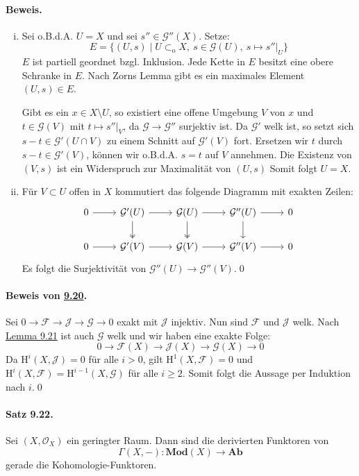 \paragraph{Beweis.}
\begin{enumerate}[(i)]
\item Sei o.B.d.A. $U=X$ und sei $s''\in\mathcal{G}''(X)$. Setze:
\[E=\{(U,s)\mid U\subset_\text{o}X,\ s\in\mathcal{G}(U),\ s\mapsto s''|_U \} \]
$E$ ist partiell geordnet bzgl. Inklusion. Jede Kette in $E$ besitzt eine obere Schranke in $E$. Nach Zorns Lemma gibt es ein maximales Element $(U,s)\in E$.

Gibt es ein $x\in X\setminus U$, so existiert eine offene Umgebung $V$ von $x$ und $t\in\mathcal{G}(V)$ mit $t\mapsto s''|_V$, da $\mathcal{G}\to\mathcal{G}''$ surjektiv ist. Da $\mathcal{G}'$ welk ist, so setzt sich $s-t\in\mathcal{G}'(U\cap V)$ zu einem Schnitt auf $\mathcal{G}'(V)$ fort. Ersetzen wir $t$ durch $s-t\in\mathcal{G}'(V)$, können wir o.B.d.A. $s=t$ auf $V$ annehmen. Die Existenz von $(V,s)$ ist ein Widerspruch zur Maximalität von $(U,s)$ Somit folgt $U=X$.
\item Für $V\subset U$ offen in $X$ kommutiert das folgende Diagramm mit exakten Zeilen:
\[\begin{tikzcd}
0 \rar & \mathcal{G}'(U)\rar\dar[two heads] & \mathcal{G}(U)\rar\dar[two heads] & \mathcal{G}''(U)\rar\dar & 0\\
0 \rar & \mathcal{G}'(V)\rar & \mathcal{G}(V)\rar & \mathcal{G}''(V)\rar & 0
\end{tikzcd} \]
Es folgt die Surjektivität von $\mathcal{G}''(U)\to\mathcal{G}''(V)$.\qed
\end{enumerate}

\paragraph{Beweis von \hyperref[9.20]{9.20}.} Sei $0\to\mathcal{F}\to\mathcal{J}\to\mathcal{G}\to 0$ exakt mit $\mathcal{J}$ injektiv. Nun sind $\mathcal{F}$ und $\mathcal{J}$ welk. Nach \hyperref[9.21]{Lemma 9.21} ist auch $\mathcal{G}$ welk und wir haben eine exakte Folge:
\[0\longrightarrow\mathcal{F}(X)\longrightarrow\mathcal{J}(X)\longrightarrow\mathcal{G}(X)\longrightarrow 0 \]
Da $\mathrm{H}^i(X,\mathcal{J})=0$ für alle $i>0$, gilt $\mathrm{H}^1(X,\mathcal{F})=0$ und $\mathrm{H}^i(X,\mathcal{F})=\mathrm{H}^{i-1}(X,\mathcal{G})$ für alle $i\geq 2$. Somit folgt die Aussage per Induktion nach $i$.\qed

\paragraph{Satz 9.22.}\label{9.22} Sei $(X,\mathcal{O}_X)$ ein geringter Raum. Dann sind die derivierten Funktoren von
\[\Gamma(X,-): \mathbf{Mod}(X)\to\mathbf{Ab} \]
gerade die Kohomologie-Funktoren.

